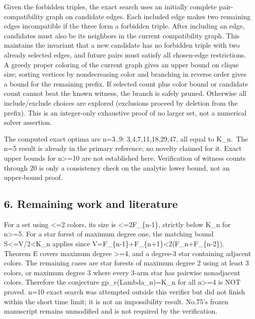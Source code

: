 \documentclass[
  10pt,
]{article}
\begin{document}
Given the forbidden triples, the exact search uses an initially complete
pair-compatibility graph on candidate edges. Each included edge makes
two remaining edges incompatible if the three form a forbidden triple.
After including an edge, candidates must also be its neighbors in the
current compatibility graph. This maintains the invariant that a new
candidate has no forbidden triple with two already selected edges, and
future pairs must satisfy all chosen-edge restrictions. A greedy proper
coloring of the current graph gives an upper bound on clique size;
sorting vertices by nondecreasing color and branching in reverse order
gives a bound for the remaining prefix. If selected count plus color
bound or candidate count cannot beat the known witness, the branch is
safely pruned. Otherwise all include/exclude choices are explored
(exclusions proceed by deletion from the prefix). This is an
integer-only exhaustive proof of no larger set, not a numerical solver
assertion.

The computed exact optima are n=3..9: 3,4,7,11,18,29,47, all equal to
K\_n.~The n=5 result is already in the primary reference; no novelty
claimed for it. Exact upper bounds for n\textgreater=10 are not
established here. Verification of witness counts through 20 is only a
consistency check on the analytic lower bound, not an upper-bound proof.

\subsection{6. Remaining work and
literature}\label{remaining-work-and-literature}

For a set using \textless=2 colors, its size is \textless=2F\_\{n-1\},
strictly below K\_n for n\textgreater=5. For a star forest of maximum
degree one, the matching bound
\textbar S\textbar\textless=\textbar V\textbar/2\textless K\_n applies
since
\textbar V\textbar=F\_\{n-1\}+F\_\{n+1\}\textless2(F\_n+F\_\{n-2\}).
Theorem E covers maximum degree \textgreater=4, and a degree-3 star
containing adjacent colors. The remaining cases are star forests of
maximum degree 2 using at least 3 colors, or maximum degree 3 where
every 3-arm star has pairwise nonadjacent colors. Therefore the
conjecture gp\_e(Lambda\_n)=K\_n for all n\textgreater=4 is NOT proved.
n=10 exact search was attempted outside this verifier but did not finish
within the short time limit; it is not an impossibility result. No.75's
frozen manuscript remains unmodified and is not required by the
verification.
\end{document}
